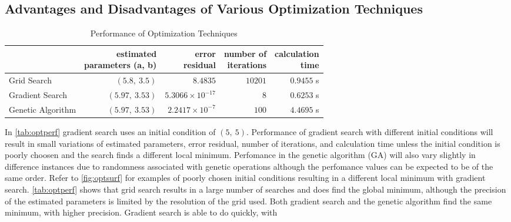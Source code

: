 \documentclass[11pt,a4paper]{article}
\begin{document}
\subsection{Advantages and Disadvantages of Various Optimization Techniques}
\begin{table}
    \centering
    \begin{tabular}{|l|r|r|r|r|}
        \hline
        \nonumber & \shortstack[c]{estimated\\parameters (a, b)} &
            \shortstack[c]{error\\residual} &
            \shortstack[c]{number of\\iterations} &
            \shortstack[c]{calculation\\time} \\
        \hline
        Grid Search & $ (5.8,\: 3.5) $ & $ 8.4835 $ & $ 10201 $ &
            $ 0.9455 $ s \\
        Gradient Search & $ (5.97,\: 3.53) $ & $ 5.3066 \times 10^{-17} $ &
            $ 8 $ & $ 0.6253 $ s \\
        Genetic Algorithm & $ (5.97,\: 3.53) $ & $ 2.2417 \times 10^{-7} $ &
            $ 100 $ & $ 4.4695 $ s \\
        \hline
    \end{tabular}
    \caption{Performance of Optimization Techniques}
    \label{tab:optperf}
\end{table}
In \autoref{tab:optperf} gradient search uses an initial condition of $ (5,\:
5) $. Performance of gradient search with different initial conditions will
result in small variations of estimated parameters, error residual, number of
iterations, and calculation time unless the initial condition is poorly choosen
and the search finds a different local minimum. Perfomance in the genetic
algorithm (GA) will also vary slightly in difference instances due to
randomness associated with genetic operations although the perfomance values
can be expected to be of the same order. Refer to \autoref{fig:optsurf} for
examples of poorly chosen initial conditions resulting in a different local
minimum with gradient search. \autoref{tab:optperf} shows that grid search
results in a large number of searches and does find the global minimum,
although the precision of the estimated parameters is limited by the resolution
of the grid used. Both gradient search and the genetic algorithm find the same
minimum, with higher precision. Gradient search is able to do quickly, with
\end{document}
